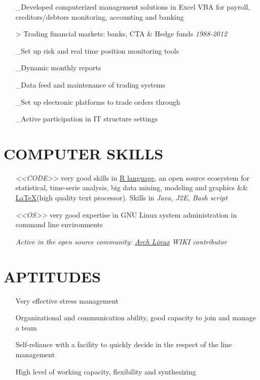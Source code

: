 \documentclass{res}
\begin{document}
\begin{resume}
\begin{enumerate}[leftmargin=0cm]
\_Developed computerized management solutions in Excel VBA for payroll, creditors/\newline debtors monitoring,  accounting and banking
\item[>]Trading financial markets: banks, CTA \& Hedge funds
\hfill \textit{1988-2012}

\_Set up risk and real time position monitoring tools

\_Dynamic monthly reports

\_Data feed and maintenance of trading systems

\_Set up electronic platforms to trade orders through 

\_Active participation in IT structure settings
\end{enumerate}

\section{COMPUTER SKILLS}
\begin{enumerate}[leftmargin=0cm]


\item[]\large{\emph{<<CODE>>}} very good skills in \href {http://www.r-project.org/}{R language}, an open source ecosystem for statistical, time-serie analysis, big data mining, modeling and graphics \&\& \href{http://latex-project.org/intro.html}{\LaTeX}(high quality text processor).
Skills in \textit{Java, J2E, Bash script}  

\item[]\large{\emph{<<OS>>}} very good expertise in GNU Linux system administration in command line environments

\textsl{Active in the open source community: \href{HTTP://www.archlinux.org/about/}{Arch Linux} WIKI contributor} 		
\end{enumerate}


\section{APTITUDES}
\begin{enumerate}[leftmargin=0cm]
\item[\ding{51}]Very effective stress management
\item[\ding{51}]Organizational and communication ability, good capacity to join and manage a team
\item[\ding{51}]Self-reliance with a facility to quickly decide in the respect of the line management
\item[\ding{51}]High level of working capacity, flexibility and synthesizing
\end{enumerate}


\end{resume}
\end{document}
